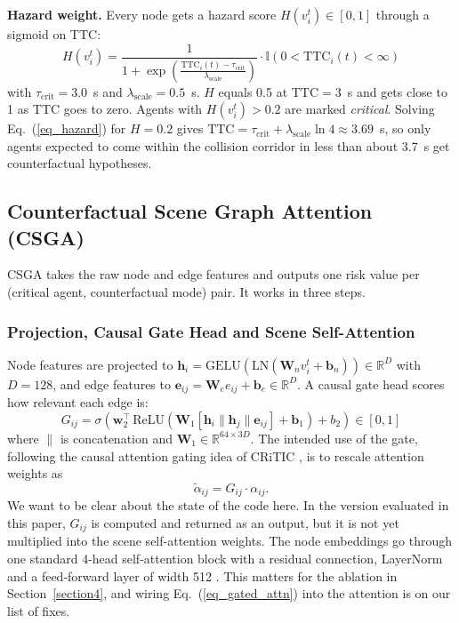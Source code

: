 \documentclass[preprint,12pt]{elsarticle}
\begin{document}
\textbf{Hazard weight.} Every node gets a hazard score $H(v_i^t) \in [0,1]$ through a sigmoid on TTC:
\begin{equation}
    H(v_i^t) = \frac{1}{1 + \exp\left(\frac{\text{TTC}_i(t) - \tau_{\text{crit}}}{\lambda_{\text{scale}}}\right)} \cdot \mathbb{I}\left(0 < \text{TTC}_i(t) < \infty\right)
    \label{eq_hazard}
\end{equation}
with $\tau_{\text{crit}} = 3.0$~s and $\lambda_{\text{scale}} = 0.5$~s. $H$ equals 0.5 at $\text{TTC} = 3$~s and gets close to 1 as TTC goes to zero. Agents with $H(v_i^t) > 0.2$ are marked \emph{critical}. Solving Eq.~(\ref{eq_hazard}) for $H = 0.2$ gives $\text{TTC} = \tau_{\text{crit}} + \lambda_{\text{scale}} \ln 4 \approx 3.69$~s, so only agents expected to come within the collision corridor in less than about 3.7~s get counterfactual hypotheses.

\subsection{Counterfactual Scene Graph Attention (CSGA)}
CSGA takes the raw node and edge features and outputs one risk value per (critical agent, counterfactual mode) pair. It works in three steps.

\subsubsection{Projection, Causal Gate Head and Scene Self-Attention}
Node features are projected to $\mathbf{h}_i = \text{GELU}(\text{LN}(\mathbf{W}_n v_i^t + \mathbf{b}_n)) \in \mathbb{R}^{D}$ with $D = 128$, and edge features to $\mathbf{e}_{ij} = \mathbf{W}_e e_{ij} + \mathbf{b}_e \in \mathbb{R}^{D}$. A causal gate head scores how relevant each edge is:
\begin{equation}
    G_{ij} = \sigma\left(\mathbf{w}_2^\top \, \text{ReLU}\left(\mathbf{W}_1 \left[\mathbf{h}_i \| \mathbf{h}_j \| \mathbf{e}_{ij}\right] + \mathbf{b}_1\right) + b_2\right) \in [0, 1]
    \label{eq_gate}
\end{equation}
where $\|$ is concatenation and $\mathbf{W}_1 \in \mathbb{R}^{64 \times 3D}$. The intended use of the gate, following the causal attention gating idea of CRiTIC \cite{ahmadi2025critic}, is to rescale attention weights as
\begin{equation}
    \tilde{\alpha}_{ij} = G_{ij} \cdot \alpha_{ij}.
    \label{eq_gated_attn}
\end{equation}
We want to be clear about the state of the code here. In the version evaluated in this paper, $G_{ij}$ is computed and returned as an output, but it is not yet multiplied into the scene self-attention weights. The node embeddings go through one standard 4-head self-attention block with a residual connection, LayerNorm and a feed-forward layer of width 512 \cite{vaswani2017attention}. This matters for the ablation in Section~\ref{section4}, and wiring Eq.~(\ref{eq_gated_attn}) into the attention is on our list of fixes.
\end{document}

